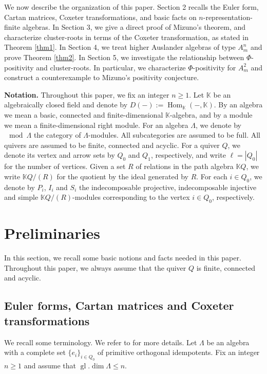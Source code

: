 \documentclass[11pt,a4paper]{amsart}
\theoremstyle{definition}
\numberwithin{equation}{section}
\newcommand{\0}{\mathbf{0}}
\newcommand{\Hom}{\operatorname{Hom}\nolimits}
\newcommand{\gl}{\operatorname{gl}.\operatorname{dim}\nolimits}
\begin{document}
	
	
	We now describe the organization of this paper. Section 2 recalls the Euler form, Cartan matrices, Coxeter
	transformations, and basic facts on $n$-representation-finite algebras.
	In Section 3, we give a direct proof of Mizuno's theorem, and characterize cluster-roots in terms of the Coxeter transformation, as stated in Theorem \ref{thm1}. In Section 4, we treat
	higher Auslander algebras of type $A_m^n$ and prove Theorem \ref{thm2}. In Section 5, we investigate the relationship between $\Phi$-positivity and cluster-roots. In particular, we characterize
	$\Phi$-positivity for $A_m^2$ and construct a counterexample to Mizuno's positivity conjecture.  
	
	\medskip
	\noindent\textbf{Notation.}
	Throughout this paper, we fix an integer $n\ge 1$. Let $\mathbb{K}$ be an algebraically closed field  and denote by  $D(-):=\Hom_{\mathbb{K}}(-,\mathbb{K})$.    By an algebra we mean a basic, connected and finite-dimensional $\mathbb{K}$-algebra, and by a module we mean a finite-dimensional right module.
	For an algebra $\Lambda$, we denote by $\mod \Lambda$ the category of  $\Lambda$-modules. All subcategories are assumed to be full. 		
	All quivers are assumed to be finite, connected and acyclic. For a quiver $Q$, we denote its vertex and arrow sets by $Q_0$ and $Q_1$,
	respectively, and write $\ell=|Q_0|$ for the number of vertices.
	Given a set $R$ of relations in the path algebra $\mathbb{K}Q$,
	we write $\mathbb{K}Q/(R)$ for the quotient by the ideal generated by $R$. 
	For each $i\in Q_0$, we denote by $P_i$, $I_i$ and $S_i$
	the indecomposable projective, indecomposable injective and simple
	$\mathbb{K}Q/(R)$-modules corresponding to the vertex $i \in Q_0$, respectively. 
	
	
	
	\section{Preliminaries}
		In this section, we recall some basic notions and facts needed in this paper.   		
		Throughout this paper, 	we always assume that the quiver $Q$ is finite, connected and acyclic.
	
	
	
	\subsection{Euler forms, Cartan matrices and Coxeter transformations} We recall some terminology. We refer to \cite{ASS,Miz,Rin} for more details. 	
	Let $\Lambda$ be an algebra with a complete set $\{e_i\}_{i\in Q_0}$ of primitive orthogonal idempotents. 
	Fix an integer $n\ge 1$ and assume that $\gl \Lambda\le n$. 
	
\end{document}
